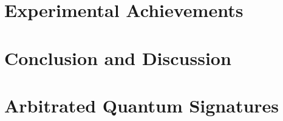 \documentclass[%
 reprint,
 amsmath,amssymb,
 aps,
 pra,
]{revtex4-1}
\begin{document}
\section{Experimental Achievements}

\section{Conclusion and Discussion}


\appendix

\section{Arbitrated Quantum Signatures}
\end{document}
